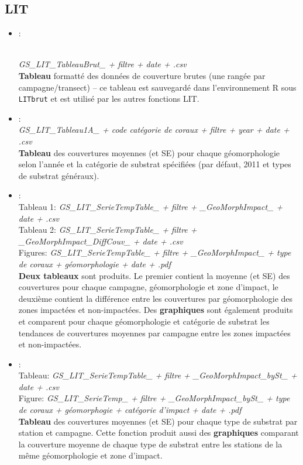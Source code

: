 \documentclass{article}
\begin{document}
\subsection{LIT}

\begin{itemize}
\item[] \hypertarget{l1}{:}\\
  \emph{GS\_LIT\_TableauBrut\_ + filtre + date + .csv}\\
  \textbf{Tableau} formatté des données
de couverture brutes (une rangée par campagne/transect) -- ce
tableau est sauvegardé dans l'environnement R sous
\texttt{LITbrut} et est utilisé par les autres fonctions LIT.

\item[] \hypertarget{l2}{}:\\
  \emph{GS\_LIT\_Tableau1A\_ + code catégorie de coraux + filtre + year + date + .csv}\\
  \textbf{Tableau} des couvertures moyennes (et SE) pour
  chaque géomorphologie selon l'année et la catégorie de substrat
  spécifiées (par défaut, 2011 et types de substrat généraux).

\item[] \hypertarget{l3}{}:\\
  Tableau 1: \emph{GS\_LIT\_SerieTempTable\_ + filtre + \_GeoMorphImpact\_ + date + .csv}\\
  Tableau 2: \emph{GS\_LIT\_SerieTempTable\_ + filtre + \_GeoMorphImpact\_DiffCouv\_ + date + .csv}\\
  Figures: \emph{GS\_LIT\_SerieTempTable\_ + filtre + \_GeoMorphImpact\_ + type de coraux + géomorphologie + date + .pdf}\\
  \textbf{Deux tableaux} sont produits. Le premier contient la
moyenne (et SE) des couvertures pour chaque campagne, géomorphologie et
zone d'impact, le deuxième contient la différence entre les
couvertures par géomorphologie des zones impactées et
non-impactées. Des \textbf{graphiques} sont également produits et
comparent pour chaque géomorphologie et catégorie de substrat les
tendances de couvertures moyennes par campagne entre les zones
impactées et non-impactées.

\item[] \hypertarget{l4}{}:\\
  Tableau: \emph{GS\_LIT\_SerieTempTable\_ + filtre + \_GeoMorphImpact\_bySt\_ + date + .csv}\\
  Figure: \emph{GS\_LIT\_SerieTemp\_ + filtre +
    \_GeoMorphImpact\_bySt\_ + type de coraux + géomorphogie +
    catégorie d'impact + date + .pdf}\\
  \textbf{Tableau} des couvertures moyennes (et SE) pour
chaque type de substrat par station et campagne. Cette fonction
produit aussi des \textbf{graphiques} comparant la couverture moyenne de chaque
type de substrat entre les stations de la même géomorphologie et zone
d'impact.


\end{itemize}
\end{document}
